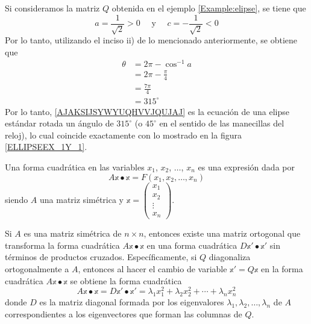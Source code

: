\begin{example}
    Si consideramos la matriz $Q$ obtenida en el ejemplo \ref{Example:elipse}, se tiene que
    $$a = \frac{1}{\sqrt{2}} > 0 \quad \text{ y } \quad c = - \frac{1}{\sqrt{2}} < 0$$
    Por lo tanto, utilizando el inciso ii) de lo mencionado anteriormente, se obtiene que
    \begin{align*}
        \theta & = 2\pi - \cos^{-1} a \\
        & = 2\pi - \frac{\pi}{4} \\
        & = \frac{7\pi}{4} \\
        & = 315^{\circ}
    \end{align*}
    Por lo tanto, \eqref{AJAKSIJSYWYUQHVVJQUJAJ} es la ecuación de una elipse estándar rotada un ángulo de $315^{\circ}$ (o $45^{\circ}$ en el sentido de las manecillas del reloj), lo cual coincide exactamente con lo mostrado en la figura \ref{ELLIPSEEX_1Y_1}.
\end{example}

\newpage

\begin{definition}
    Una forma cuadrática en las variables $x_1$, $x_2$, $\dots$, $x_n$ es una expresión dada por
    $$A\mathbb{x} \bullet \mathbb{x} = F(x_1, x_2, \dots, x_n)$$
    siendo $A$ una matriz simétrica y $\mathbb{x} = \begin{pmatrix} x_1 \\ x_2 \\ \vdots \\ x_n \end{pmatrix}$.
\end{definition}

\begin{theorem}\label{theo:ejes_principales}
    Si $A$ es una matriz simétrica de $n \times n$, entonces existe una matriz ortogonal que transforma la forma cuadrática $A\mathbb{x} \bullet \mathbb{x}$ en una forma cuadrática $D\mathbb{x}' \bullet \mathbb{x}'$ sin términos de productos cruzados. Específicamente, si $Q$ diagonaliza ortogonalmente a $A$, entonces al hacer el cambio de variable $\mathbb{x}' = Q \mathbb{x}$ en la forma cuadrática $A\mathbb{x} \bullet \mathbb{x}$ se obtiene la forma cuadrática
    $$A\mathbb{x} \bullet \mathbb{x} = D\mathbb{x}' \bullet \mathbb{x}' = \lambda_1 x_1^2 + \lambda_2 x_2^2 + \cdots + \lambda_n x_n^2$$
    donde $D$ es la matriz diagonal formada por los eigenvalores $\lambda_1, \lambda_2, \ldots, \lambda_n$ de $A$ correspondientes a los eigenvectores que forman las columnas de $Q$.
\end{theorem}

